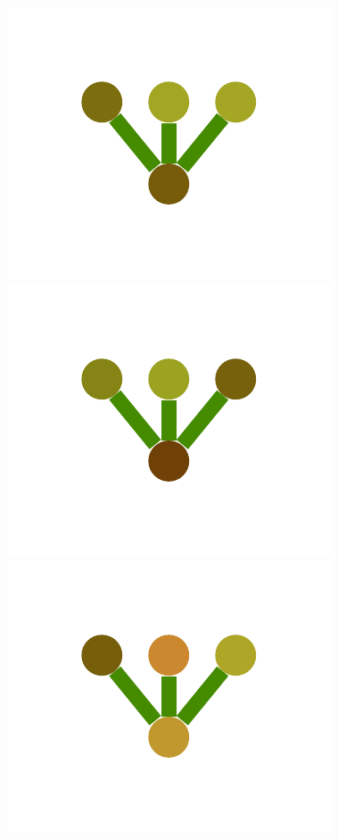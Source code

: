 \documentclass[a4paper,10pt]{article}
\begin{document}
\begin{figure}
{    \includegraphics[scale=.2]{./figures/6-2-multiple-color-flower-induced-3.pdf}
    \includegraphics[scale=.2]{./figures/6-2-multiple-color-flower-induced-4.pdf}
    \includegraphics[scale=.2]{./figures/6-2-multiple-color-flower-induced-5.pdf}
}
\end{figure}
\end{document}
